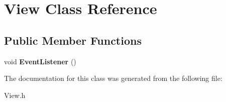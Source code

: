 \hypertarget{classView}{}\section{View Class Reference}
\label{classView}
\subsection*{Public Member Functions}
\begin{DoxyCompactItemize}
\item 
\mbox{\label{classView_aad48b922cbd2efb97313d597a088ce2a}} 
void {\bfseries Event\+Listener} ()
\end{DoxyCompactItemize}


The documentation for this class was generated from the following file\+:\begin{DoxyCompactItemize}
\item 
View.\+h\end{DoxyCompactItemize}
